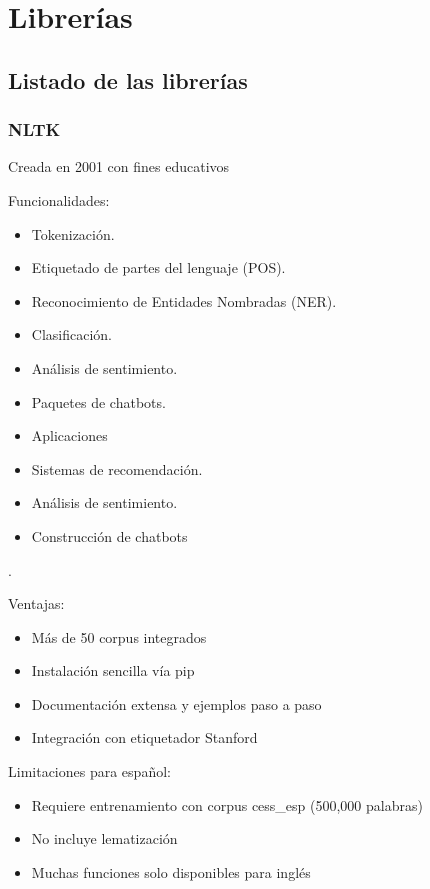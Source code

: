 \documentclass{report}
\begin{document}
\section{Librerías}
\subsection{Listado de las librerías}

\etocinline\localtableofcontents

\subsubsection{NLTK}
Creada en 2001 con fines educativos

Funcionalidades:
\begin{itemize}
    \item Tokenización.
    \item Etiquetado de partes del lenguaje (POS).
    \item Reconocimiento de Entidades Nombradas (NER).
    \item Clasificación.
    \item Análisis de sentimiento.
    \item Paquetes de chatbots.
    \item Aplicaciones
    \item Sistemas de recomendación.
    \item Análisis de sentimiento.
    \item Construcción de chatbots
\end{itemize}.


Ventajas:
\begin{itemize}
    \item Más de 50 corpus integrados
    \item Instalación sencilla vía pip
    \item Documentación extensa y ejemplos paso a paso
    \item Integración con etiquetador Stanford
\end{itemize}

Limitaciones para español:

\begin{itemize}
    \item Requiere entrenamiento con corpus cess\_esp (500,000 palabras)
    \item No incluye lematización
    \item Muchas funciones solo disponibles para inglés
\end{itemize}
\end{document}
